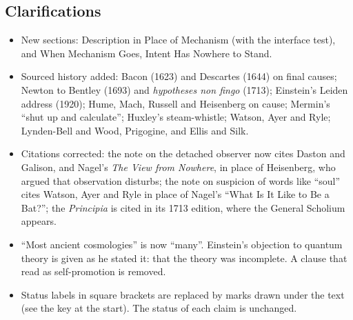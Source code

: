 \documentclass[11pt,a4paper]{article}
\begin{document}
\subsection*{Clarifications}
\begin{itemize}
  \item New sections: Description in Place of Mechanism (with the interface test), and When Mechanism Goes, Intent Has Nowhere to Stand.
  \item Sourced history added: Bacon (1623) and Descartes (1644) on final causes; Newton to Bentley (1693) and \emph{hypotheses non fingo} (1713); Einstein's Leiden address (1920); Hume, Mach, Russell and Heisenberg on cause; Mermin's ``shut up and calculate''; Huxley's steam-whistle; Watson, Ayer and Ryle; Lynden-Bell and Wood, Prigogine, and Ellis and Silk.
  \item Citations corrected: the note on the detached observer now cites Daston and Galison, and Nagel's \emph{The View from Nowhere}, in place of Heisenberg, who argued that observation disturbs; the note on suspicion of words like ``soul'' cites Watson, Ayer and Ryle in place of Nagel's ``What Is It Like to Be a Bat?''; the \emph{Principia} is cited in its 1713 edition, where the General Scholium appears.
  \item ``Most ancient cosmologies'' is now ``many''. Einstein's objection to quantum theory is given as he stated it: that the theory was incomplete. A clause that read as self-promotion is removed.
  \item Status labels in square brackets are replaced by marks drawn under the text (see the key at the start). The status of each claim is unchanged.
\end{itemize}

\newpage


\end{document}
